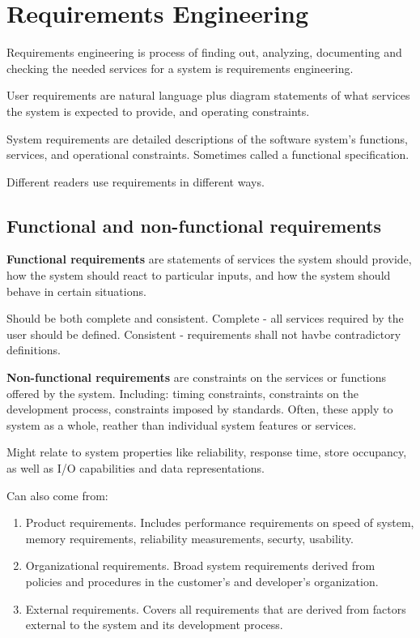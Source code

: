 \documentclass{article}
\begin{document}
\setcounter{section}{3}
\section{Requirements Engineering}
Requirements engineering is process of finding out, analyzing, documenting and checking the needed services for a system is requirements engineering.

User requirements are natural language plus diagram statements of what services the system is expected to provide, and operating constraints.

System requirements are detailed descriptions of the software system's functions, services, and operational constraints.  Sometimes called a functional specification.

Different readers use requirements in different ways.
\subsection{Functional and non-functional requirements}
\textbf{Functional requirements} are statements of services the system should provide, how the system should react to particular inputs, and how the system should behave in certain situations.

Should be both complete and consistent.  Complete - all services required by the user should be defined.  Consistent - requirements shall not havbe contradictory definitions.

\textbf{Non-functional requirements} are constraints on the services or functions offered by the system.  Including: timing constraints, constraints on the development process, constraints imposed by standards.  Often, these apply to system as a whole, reather than individual system features or services.

Might relate to system properties like reliability, response time, store occupancy, as well as I/O capabilities and data representations.

Can also come from:
\begin{enumerate}
    \item Product requirements.  Includes performance requirements on speed of system, memory requirements, reliability measurements, securty, usability.
    \item Organizational requirements.  Broad system requirements derived from policies and procedures in the customer's and developer's organization.
    \item External requirements.  Covers all requirements that are derived from factors external to the system and its development process.
\end{enumerate}
\end{document}
